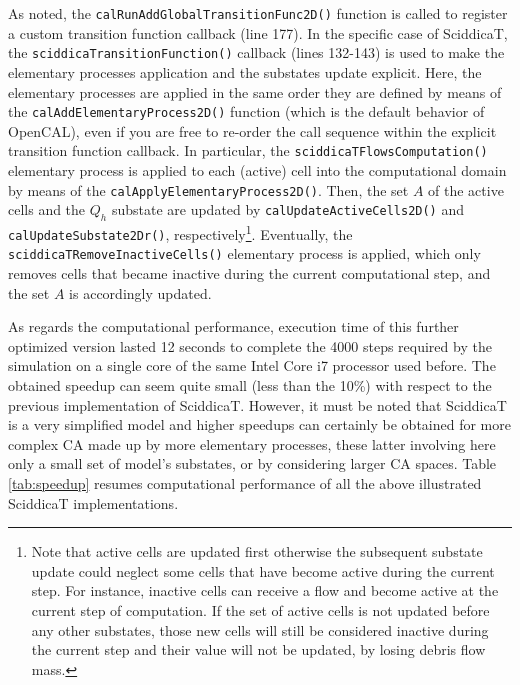 As noted, the \verb'calRunAddGlobalTransitionFunc2D()' function is
called to register a custom transition function callback (line
177). In the specific case of SciddicaT, the
\verb'sciddicaTransitionFunction()' callback (lines 132-143) is used
to make the elementary processes application and the substates update
explicit. Here, the elementary processes are applied in the same order
they are defined by means of the \verb'calAddElementaryProcess2D()'
function (which is the default behavior of OpenCAL), even if you are
free to re-order the call sequence within the explicit transition
function callback. In particular, the \verb'sciddicaTFlowsComputation()'
elementary process is applied to each (active) cell into the
computational domain by means of the
\verb'calApplyElementaryProcess2D()'. Then, the set $A$ of the active
cells and the $Q_h$ substate are updated by
\verb'calUpdateActiveCells2D()' and \verb'calUpdateSubstate2Dr()',
respectively\footnote{Note that active cells are updated first
  otherwise the subsequent substate update could neglect some cells
  that have become active during the current step. For instance,
  inactive cells can receive a flow and become active at the current
  step of computation. If the set of active cells is not updated
  before any other substates, those new cells will still be considered
  inactive during the current step and their value will not be
  updated, by losing debris flow mass.}. Eventually, the
\verb'sciddicaTRemoveInactiveCells()' elementary process is
applied, which only removes cells that became inactive during the
current computational step, and the set $A$ is accordingly updated.


As regards the computational performance, execution time of this
further optimized version lasted 12 seconds to complete the 4000 steps
required by the simulation on a single core of the same Intel Core i7
processor used before. The obtained speedup can seem quite small
(less than the 10\%) with respect to the previous implementation of
SciddicaT. However, it must be noted that SciddicaT is a very
simplified model and higher speedups can certainly be obtained for
more complex CA made up by more elementary processes, these latter
involving here only a small set of model's substates, or by considering larger CA spaces. Table
\ref{tab:speedup} resumes computational performance of all the above
illustrated SciddicaT implementations.


